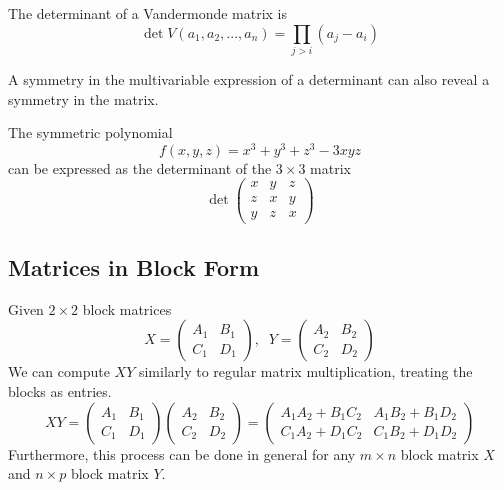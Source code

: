   \begin{theorem}
    The determinant of a Vandermonde matrix is
    \begin{equation}
      \det{V(a_1, a_2, ..., a_n)} = \prod_{j>i} (a_j - a_i)
    \end{equation}
  \end{theorem}

  A symmetry in the multivariable expression of a determinant can also reveal a symmetry in the matrix.

  \begin{example}[2019 Putnam A1]
    The symmetric polynomial 
    \begin{equation}
       f(x, y, z) = x^3 + y^3 + z^3 - 3 x y z
    \end{equation}
    can be expressed as the determinant of the $3 \times 3$ matrix
    \begin{equation}
      \det{\begin{pmatrix}
      x&y&z\\
      z&x&y\\
      y&z&x
      \end{pmatrix}}
    \end{equation}
  \end{example}

\subsection{Matrices in Block Form}

  \begin{theorem}
    Given $2 \times 2$ block matrices
    \begin{equation}
      X = \begin{pmatrix}
      A_1&B_1\\C_1&D_1
      \end{pmatrix}, \; \; Y = \begin{pmatrix}
      A_2&B_2\\C_2&D_2
      \end{pmatrix}
    \end{equation}
    We can compute $X Y$ similarly to regular matrix multiplication, treating the blocks as entries. 
    \begin{equation}
      X Y = \begin{pmatrix}
      A_1&B_1\\C_1&D_1
      \end{pmatrix} \begin{pmatrix}
      A_2&B_2\\C_2&D_2
      \end{pmatrix} = \begin{pmatrix}
      A_1 A_2 + B_1 C_2 & A_1 B_2 + B_1 D_2 \\
      C_1 A_2 + D_1 C_2 & C_1 B_2 + D_1 D_2 
      \end{pmatrix}
    \end{equation}
    Furthermore, this process can be done in general for any $m \times n$ block matrix $X$ and $n \times p$ block matrix $Y$. 
  \end{theorem}

